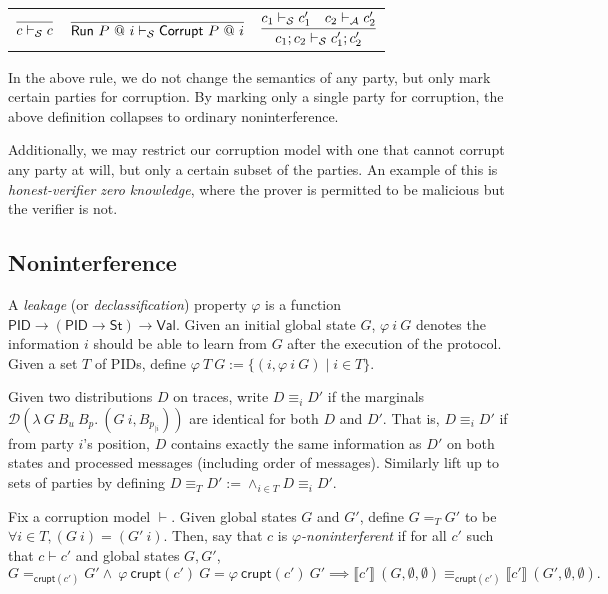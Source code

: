 \documentclass{article}
\newcommand{\Val}{\mathsf{Val}}
\newcommand{\St}{\mathsf{St}}
\newcommand{\PID}{\mathsf{PID}}
\begin{document}
\begin{tabular}{ccc}
    $\infer{c \vdash_{\mathcal{S}} c}{}$ & 
    $\infer{\textsf{Run}\ P\ @\ i \vdash_{\mathcal{S}} \textsf{Corrupt}\ P\ @\ i}{}$ &
    $\infer{c_1;c_2 \vdash_{\mathcal{S}} c_1'; c_2'} {c_1 \vdash_\mathcal{S} c_1' & c_2 \vdash_\mathcal{A} c_2'}$ \\
\end{tabular}

In the above rule, we do not change the semantics of any party, but only mark certain parties for corruption. By marking only a single party for corruption, the above definition collapses to ordinary noninterference.

Additionally, we may restrict our corruption model with one that cannot corrupt any party at will, but only a certain subset of the parties. An example of this is \emph{honest-verifier zero knowledge}, where the prover is permitted to be malicious but the verifier is not.

\subsection{Noninterference}

A \emph{leakage} (or \emph{declassification}) property $\varphi$ is a function $\PID \to (\PID \to \St) \to \Val$. Given an initial global state $G$, $\varphi\ i\ G$ denotes the information $i$ should be able to learn from $G$ after the execution of the protocol. Given a set $T$ of PIDs, define $\varphi\ T\ G := \{(i, \varphi\ i\ G) \mid i \in T\}$.

Given two distributions $D$ on traces, write $D \equiv_i D'$ if the marginals $\mathcal{D} (\lambda\ G\ B_u\ B_p.\ (G\ i, B_{p_{| i}}))$ are identical for both $D$ and $D'$. That is, $D \equiv_i D'$ if from party $i$'s position, $D$ contains exactly the same information as $D'$ on both states and processed messages (including order of messages). Similarly lift up to sets of parties by defining $D \equiv_T D' := \wedge_{i \in T} D \equiv_i D'$.


Fix a corruption model $\vdash$. Given global states $G$ and $G'$, define $G =_T G'$ to be $\forall i \in T, (G\ i) = (G'\ i).$ Then, say that $c$ is \emph{$\varphi$-noninterferent} if for all $c'$ such that $c \vdash c'$ and global states $G, G'$, 
\[ G=_{\mathsf{crupt}(c')}G' \wedge\ \varphi\ \mathsf{crupt}(c')\ G = \varphi\ \mathsf{crupt}(c')\ G' \implies \llbracket c' \rrbracket\ (G, \emptyset, \emptyset) \equiv_{\mathsf{crupt}(c')} \llbracket c' \rrbracket\ (G', \emptyset, \emptyset).\]
\end{document}
